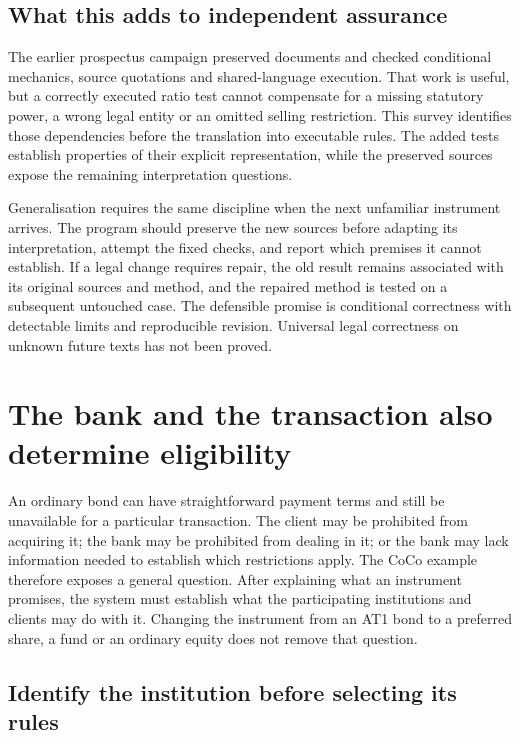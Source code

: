 \documentclass[12pt,a4paper,oneside,openany]{book}
\begin{document}
\subsection{What this adds to independent assurance}

The earlier prospectus campaign preserved documents and checked conditional
mechanics, source quotations and shared-language execution. That work is useful,
but a correctly executed ratio test cannot compensate for a missing statutory
power, a wrong legal entity or an omitted selling restriction. This survey
identifies those dependencies before the translation into executable rules.
The added tests establish properties of their explicit representation, while
the preserved sources expose the remaining interpretation questions.

Generalisation requires the same discipline when the next unfamiliar instrument
arrives. The program should preserve the new sources before adapting its
interpretation, attempt the fixed checks, and report which premises it cannot
establish. If a legal change requires repair, the old result remains associated
with its original sources and method, and the repaired method is tested on a
subsequent untouched case. The defensible promise is conditional correctness
with detectable limits and reproducible revision. Universal legal correctness
on unknown future texts has not been proved.


\section{The bank and the transaction also determine eligibility}
\label{sec:bank-compliance}

An ordinary bond can have straightforward payment terms and still be unavailable
for a particular transaction. The client may be prohibited from acquiring it;
the bank may be prohibited from dealing in it; or the bank may lack information
needed to establish which restrictions apply. The CoCo example therefore exposes
a general question. After explaining what an instrument promises, the system
must establish what the participating institutions and clients may do with it.
Changing the instrument from an AT1 bond to a preferred share, a fund or an
ordinary equity does not remove that question.

\subsection{Identify the institution before selecting its rules}
\end{document}
